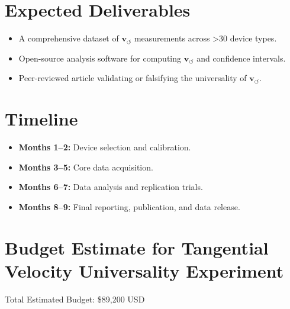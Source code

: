 \documentclass[preprint]{revtex4-2}
\begin{document}
        \section*{Expected Deliverables}
        \begin{itemize}
            \item A comprehensive dataset of \( \mathbf{v}_{\scriptscriptstyle\boldsymbol{\circlearrowleft}} \) measurements across >30 device types.
            \item Open-source analysis software for computing \( \mathbf{v}_{\scriptscriptstyle\boldsymbol{\circlearrowleft}} \) and confidence intervals.
            \item Peer-reviewed article validating or falsifying the universality of \( \mathbf{v}_{\scriptscriptstyle\boldsymbol{\circlearrowleft}} \).
        \end{itemize}

        \section*{Timeline}
        \begin{itemize}
            \item \textbf{Months 1–2:} Device selection and calibration.
            \item \textbf{Months 3–5:} Core data acquisition.
            \item \textbf{Months 6–7:} Data analysis and replication trials.
            \item \textbf{Months 8–9:} Final reporting, publication, and data release.
        \end{itemize}

\section*{Budget Estimate for Tangential Velocity Universality Experiment}

Total Estimated Budget: \$89,200 USD
\end{document}
